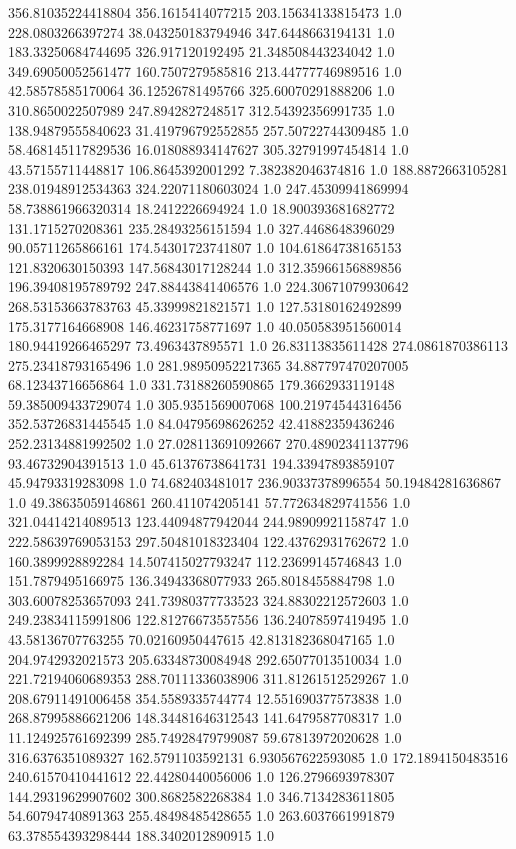 356.81035224418804	356.1615414077215	203.15634133815473	1.0
228.0803266397274	38.043250183794946	347.6448663194131	1.0
183.33250684744695	326.917120192495	21.348508443234042	1.0
349.69050052561477	160.7507279585816	213.44777746989516	1.0
42.58578585170064	36.12526781495766	325.60070291888206	1.0
310.8650022507989	247.8942827248517	312.54392356991735	1.0
138.94879555840623	31.419796792552855	257.50722744309485	1.0
58.468145117829536	16.018088934147627	305.32791997454814	1.0
43.57155711448817	106.8645392001292	7.382382046374816	1.0
188.8872663105281	238.01948912534363	324.22071180603024	1.0
247.45309941869994	58.738861966320314	18.2412226694924	1.0
18.900393681682772	131.1715270208361	235.28493256151594	1.0
327.4468648396029	90.05711265866161	174.54301723741807	1.0
104.61864738165153	121.8320630150393	147.56843017128244	1.0
312.35966156889856	196.39408195789792	247.88443841406576	1.0
224.30671079930642	268.53153663783763	45.33999821821571	1.0
127.53180162492899	175.3177164668908	146.46231758771697	1.0
40.050583951560014	180.94419266465297	73.4963437895571	1.0
26.83113835611428	274.0861870386113	275.23418793165496	1.0
281.98950952217365	34.887797470207005	68.12343716656864	1.0
331.73188260590865	179.3662933119148	59.385009433729074	1.0
305.9351569007068	100.21974544316456	352.53726831445545	1.0
84.04795698626252	42.41882359436246	252.23134881992502	1.0
27.028113691092667	270.48902341137796	93.46732904391513	1.0
45.61376738641731	194.33947893859107	45.94793319283098	1.0
74.682403481017	236.90337378996554	50.19484281636867	1.0
49.38635059146861	260.411074205141	57.772634829741556	1.0
321.04414214089513	123.44094877942044	244.98909921158747	1.0
222.58639769053153	297.50481018323404	122.43762931762672	1.0
160.3899928892284	14.507415027793247	112.23699145746843	1.0
151.7879495166975	136.34943368077933	265.8018455884798	1.0
303.60078253657093	241.73980377733523	324.88302212572603	1.0
249.23834115991806	122.81276673557556	136.24078597419495	1.0
43.58136707763255	70.02160950447615	42.813182368047165	1.0
204.9742932021573	205.63348730084948	292.65077013510034	1.0
221.72194060689353	288.70111336038906	311.81261512529267	1.0
208.67911491006458	354.5589335744774	12.551690377573838	1.0
268.87995886621206	148.34481646312543	141.6479587708317	1.0
11.124925761692399	285.74928479799087	59.67813972020628	1.0
316.6376351089327	162.5791103592131	6.930567622593085	1.0
172.1894150483516	240.61570410441612	22.44280440056006	1.0
126.2796693978307	144.29319629907602	300.8682582268384	1.0
346.7134283611805	54.60794740891363	255.48498485428655	1.0
263.6037661991879	63.378554393298444	188.3402012890915	1.0
